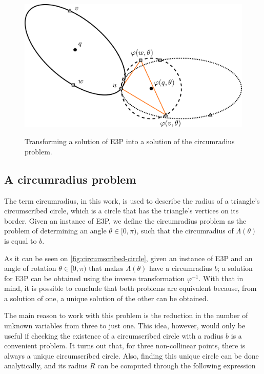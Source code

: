 \begin{figure}
	\centering
	\caption{Transforming a solution of E3P into a solution of the circumradius problem.}
	\includegraphics[scale=.5]{tex/figures/circumscribed-circle}
	\fautor
	\label{fig:circumscribed-circle}
\end{figure}

\subsection{A circumradius problem}

The term circumradius, in this work, is used to describe the radius of a triangle's circumscribed circle, which is a circle that has the triangle's vertices on its border. Given an instance of E3P, we define the circumradius problem as the problem of determining an angle $\theta\in[0, \pi)$, such that the circumradius of $\Lambda(\theta)$ is equal to $b$.

As it can be seen on \autoref{fig:circumscribed-circle}, given an instance of E3P and an angle of rotation $\theta\in[0, \pi)$ that makes $\Lambda(\theta)$ have a circumradius $b$; a solution for E3P can be obtained using the inverse transformation $\varphi^{-1}$. 
With that in mind, it is possible to conclude that both problems are equivalent because, from a solution of one, a unique solution of the other can be obtained.

The main reason to work with this problem is the reduction in the number of unknown variables from three to just one. This idea, however, would only be useful if checking the existence of a circumscribed circle with a radius $b$ is a convenient problem.
It turns out that, for three non-collinear points, there is always a unique circumscribed circle. Also, finding this unique circle can be done analytically, and its radius $R$ can be computed through the following expression

